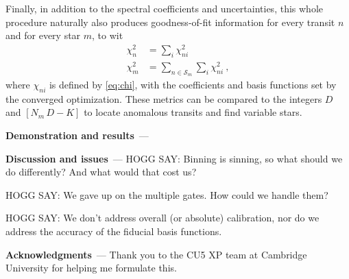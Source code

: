 \documentclass{article}
\renewcommand{\paragraph}[1]{\bigskip\par\noindent\textbf{#1}~---}
\newcommand{\set}[1]{\mathscr{#1}}
\begin{document}
Finally, in addition to the spectral coefficients and uncertainties, this whole procedure naturally also produces goodness-of-fit information for every transit $n$ and for every star $m$, to wit
\begin{align}
    \chi^2_n &= \sum_{i} \chi_{ni}^2 \\
    \chi^2_m &= \sum_{n\in\set{S}_m}\sum_{i} \chi_{ni}^2 ~,
\end{align}
where $\chi_{ni}$ is defined by \eqref{eq:chi}, with the coefficients and basis functions set by the converged optimization.
These metrics can be compared to the integers $D$ and $[N_m\,D-K]$ to locate anomalous transits and find variable stars.

\paragraph{Demonstration and results}

\paragraph{Discussion and issues}
HOGG SAY: Binning is sinning, so what should we do differently? And what would that cost us?

HOGG SAY: We gave up on the multiple gates. How could we handle them?

HOGG SAY: We don't address overall (or absolute) calibration, nor do we address the accuracy of the fiducial basis functions.

\paragraph{Acknowledgments}
Thank you to the CU5 XP team at Cambridge University for helping me formulate this.
\end{document}
